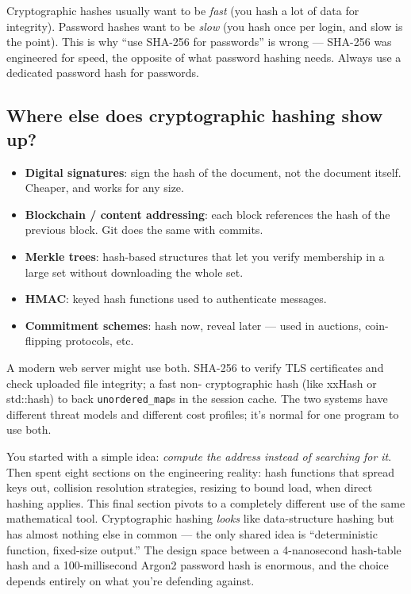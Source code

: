 \documentclass[11pt]{article}
\begin{document}
\begin{ideabox}
Cryptographic hashes usually want to be \emph{fast} (you hash a
lot of data for integrity). Password hashes want to be
\emph{slow} (you hash once per login, and slow is the point).
This is why ``use SHA-256 for passwords'' is wrong --- SHA-256
was engineered for speed, the opposite of what password hashing
needs. Always use a dedicated password hash for passwords.
\end{ideabox}

\subsection*{Where else does cryptographic hashing show up?}

\begin{itemize}[leftmargin=*]
    \item \textbf{Digital signatures}: sign the hash of the
          document, not the document itself. Cheaper, and works
          for any size.
    \item \textbf{Blockchain / content addressing}: each block
          references the hash of the previous block. Git does
          the same with commits.
    \item \textbf{Merkle trees}: hash-based structures that let
          you verify membership in a large set without
          downloading the whole set.
    \item \textbf{HMAC}: keyed hash functions used to authenticate
          messages.
    \item \textbf{Commitment schemes}: hash now, reveal later ---
          used in auctions, coin-flipping protocols, etc.
\end{itemize}

\begin{notebox}
A modern web server might use both. SHA-256 to verify TLS
certificates and check uploaded file integrity; a fast non-
cryptographic hash (like xxHash or std::hash) to back
\texttt{unordered\_map}s in the session cache. The two systems
have different threat models and different cost profiles; it's
normal for one program to use both.
\end{notebox}

\begin{ideabox}
You started with a simple idea: \emph{compute the address instead
of searching for it}. Then spent eight sections on the
engineering reality: hash functions that spread keys out,
collision resolution strategies, resizing to bound load, when
direct hashing applies. This final section pivots to a completely
different use of the same mathematical tool. Cryptographic
hashing \emph{looks} like data-structure hashing but has almost
nothing else in common --- the only shared idea is ``deterministic
function, fixed-size output.'' The design space between a
4-nanosecond hash-table hash and a 100-millisecond Argon2 password
hash is enormous, and the choice depends entirely on what you're
defending against.
\end{ideabox}
\end{document}
